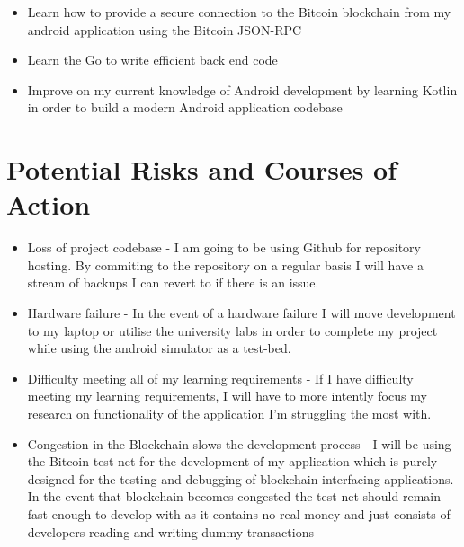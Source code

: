 \documentclass{article}
\begin{document}
\begin{itemize}

\item Learn how to provide a secure connection to the Bitcoin blockchain from
    my android application using the Bitcoin JSON-RPC

\item Learn the Go to write efficient back end code

\item Improve on my current knowledge of Android development by learning
    Kotlin in order to build a modern Android application codebase 

\end{itemize}

\section{Potential Risks and Courses of Action}

\begin{itemize}

\item Loss of project codebase - I am going to be using Github for repository
  hosting. By commiting to the repository on a regular basis I will have a
  stream of backups I can revert to if there is an issue. 

\item Hardware failure - In the event of a hardware failure I will move
  development to my laptop or utilise the university labs in order to complete
  my project while using the android simulator as a test-bed.

\item Difficulty meeting all of my learning requirements - If I have difficulty
  meeting my learning requirements, I will have to more intently focus my
  research on functionality of the application I'm struggling the most with.

\item Congestion in the Blockchain slows the development process - I will be
  using the Bitcoin test-net for the development of my application which is
  purely designed for the testing and debugging of blockchain interfacing
  applications. In the event that blockchain becomes congested the test-net
  should remain fast enough to develop with as it contains no real money and
  just consists of developers reading and writing dummy transactions

\end{itemize}
\end{document}
